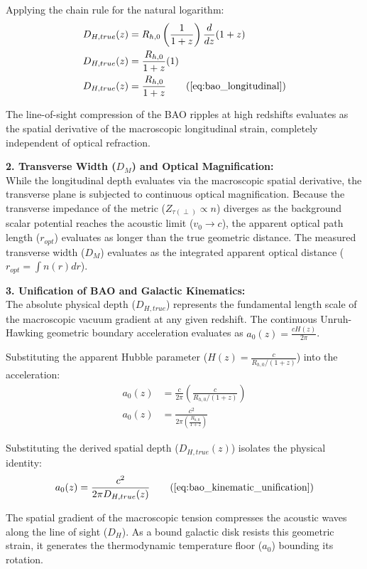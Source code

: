 \documentclass[11pt, a4paper]{article}
\begin{document}
Applying the chain rule for the natural logarithm:
\begin{align}
    D_{H,true}(z) &= R_{h,0} \left( \frac{1}{1+z} \right) \frac{d}{dz}(1+z) \\
    D_{H,true}(z) &= \frac{R_{h,0}}{1+z} (1) \\
    D_{H,true}(z) &= \frac{R_{h,0}}{1+z} \tag{\ref{eq:bao_longitudinal}}
\end{align}

The line-of-sight compression of the BAO ripples at high redshifts evaluates   as the spatial derivative of the macroscopic longitudinal strain, completely independent of optical refraction. 

\textbf{2. Transverse Width ($D_M$) and Optical Magnification:} \\
While the longitudinal depth evaluates via the macroscopic spatial derivative, the transverse plane is subjected to continuous optical magnification. Because the transverse impedance of the metric ($Z_{\tau(\perp)} \propto n$) diverges as the background scalar potential reaches the acoustic limit ($v_0 \to c$), the apparent optical path length ($r_{opt}$) evaluates as longer than the true geometric distance. The measured transverse width ($D_M$) evaluates as the integrated apparent optical distance ($r_{opt} = \int n(r)dr$).

\textbf{3. Unification of BAO and Galactic Kinematics:} \\
The absolute physical depth ($D_{H,true}$) represents the fundamental length scale of the macroscopic vacuum gradient at any given redshift. The continuous Unruh-Hawking geometric boundary acceleration evaluates as $a_0(z) = \frac{c H(z)}{2\pi}$. 

Substituting the apparent Hubble parameter ($H(z) = \frac{c}{R_{h,0}/(1+z)}$) into the acceleration:
\begin{align}
    a_0(z) &= \frac{c}{2\pi} \left( \frac{c}{R_{h,0} / (1+z)} \right) \\
    a_0(z) &= \frac{c^2}{2\pi \left( \frac{R_{h,0}}{1+z} \right)}
\end{align}

Substituting the derived spatial depth ($D_{H,true}(z)$) isolates the physical identity:
\begin{equation}
    a_0(z) = \frac{c^2}{2\pi D_{H,true}(z)} \tag{\ref{eq:bao_kinematic_unification}}
\end{equation}

The spatial gradient of the macroscopic tension compresses the acoustic waves along the line of sight ($D_H$). As a bound galactic disk resists this geometric strain, it generates the thermodynamic temperature floor ($a_0$) bounding its rotation.
\end{document}
